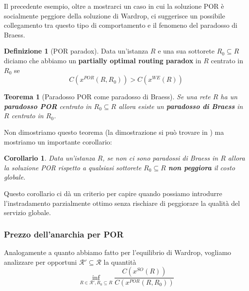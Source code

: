 \documentclass[a4paper]{article}
\newcounter{counter1}
\theoremstyle{plain}
\newtheorem{myteo}[counter1]{Teorema}
\newtheorem{mycor}[counter1]{Corollario}
\theoremstyle{definition}
\newtheorem{mydef}[counter1]{Definizione}
\theoremstyle{remark}
\newcommand{\pa}[1]{\left(#1\right)}
\begin{document}
Il precedente esempio, oltre a mostrarci un caso in cui la soluzione
POR è socialmente peggiore della soluzione di Wardrop, ci suggerisce
un possibile collegamento tra questo tipo di comportamento e il
fenomeno del paradosso di Braess.

\begin{mydef}[POR paradox]
  Data un'istanza $R$ e una sua sottorete $R_0 \subseteq R$ diciamo
  che abbiamo un \textbf{partially optimal routing paradox} in $R$
  centrato in $R_0$ se 
  \[ C\pa{ x^{POR} (R,R_0)} > C\pa{ x^{WE} (R)} \]
\end{mydef}

\begin{myteo}[Paradosso POR come paradosso di Braess]
  Se una rete $R$ ha un \textbf{paradosso POR} centrato in
  $R_0\subseteq R$ allora esiste un \textbf{paradosso di Braess} in
  $R$ centrato in $R_0$.
\end{myteo}

Non dimostriamo questo teorema (la dimostrazione si può trovare in
\cite[Proposizione 1]{acemoglu2007}) ma mostriamo un importante
corollario:
\begin{mycor}
  Data un'istanza $R$, se non ci sono paradossi di Braess in $R$
  allora la soluzione POR rispetto a qualsiasi sottorete
  $R_0 \subseteq R$ \textbf{non peggiora} il costo globale.
\end{mycor}

Questo corollario ci dà un criterio per capire quando possiamo
introdurre l'instradamento parzialmente ottimo senza rischiare di
peggiorare la qualità del servizio globale.

\subsubsection{Prezzo dell'anarchia per POR}
\label{sec:poa-por}

Analogamente a quanto abbiamo fatto per l'equilibrio di Wardrop,
vogliamo analizzare per opportuni $\mathcal{R}' \subseteq \mathcal{R}$
la quantità
\[ \inf _{R \in \mathcal{R}', R_0 \subseteq R}
  \frac{C\pa{x^{SO}\pa{R}}}{C\pa{x^{POR}\pa{R,R_0}}} \]
\end{document}
